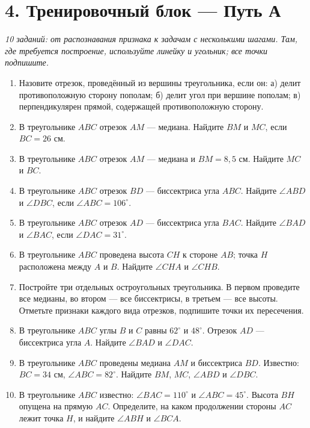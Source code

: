 \documentclass[a4paper,12pt]{article}
\newcommand{\sectionline}{\par\vspace{-3mm}{\color{accent}\hrule height .5pt}\vspace{4mm}}
\begin{document}
\clearpage
\section*{4. Тренировочный блок --- Путь А}
\sectionline
\textit{10 заданий: от распознавания признака к задачам с несколькими шагами. Там, где требуется построение, используйте линейку и угольник; все точки подпишите.}
\begin{enumerate}[label=\textcolor{accent}{\bfseries\arabic*.}]
\item Назовите отрезок, проведённый из вершины треугольника, если он: а) делит противоположную сторону пополам; б) делит угол при вершине пополам; в) перпендикулярен прямой, содержащей противоположную сторону.
\item В треугольнике $ABC$ отрезок $AM$ --- медиана. Найдите $BM$ и $MC$, если $BC=26$ см.
\item В треугольнике $ABC$ отрезок $AM$ --- медиана и $BM=8{,}5$ см. Найдите $MC$ и $BC$.
\item В треугольнике $ABC$ отрезок $BD$ --- биссектриса угла $ABC$. Найдите $\angle ABD$ и $\angle DBC$, если $\angle ABC=106^\circ$.
\item В треугольнике $ABC$ отрезок $AD$ --- биссектриса угла $BAC$. Найдите $\angle BAD$ и $\angle BAC$, если $\angle DAC=31^\circ$.
\item В треугольнике $ABC$ проведена высота $CH$ к стороне $AB$; точка $H$ расположена между $A$ и $B$. Найдите $\angle CHA$ и $\angle CHB$.
\item Постройте три отдельных остроугольных треугольника. В первом проведите все медианы, во втором --- все биссектрисы, в третьем --- все высоты. Отметьте признаки каждого вида отрезков, подпишите точки их пересечения.
\item В треугольнике $ABC$ углы $B$ и $C$ равны $62^\circ$ и $48^\circ$. Отрезок $AD$ --- биссектриса угла $A$. Найдите $\angle BAD$ и $\angle DAC$.
\item В треугольнике $ABC$ проведены медиана $AM$ и биссектриса $BD$. Известно: $BC=34$ см, $\angle ABC=82^\circ$. Найдите $BM$, $MC$, $\angle ABD$ и $\angle DBC$.
\item В треугольнике $ABC$ известно: $\angle BAC=110^\circ$ и $\angle ABC=45^\circ$. Высота $BH$ опущена на прямую $AC$. Определите, на каком продолжении стороны $AC$ лежит точка $H$, и найдите $\angle ABH$ и $\angle BCA$.
\end{enumerate}

\clearpage
\end{document}
